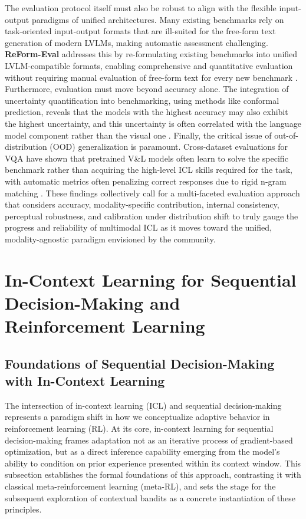 \documentclass[11pt]{article}
\begin{document}
The evaluation protocol itself must also be robust to align with the flexible input-output paradigms of unified architectures. Many existing benchmarks rely on task-oriented input-output formats that are ill-suited for the free-form text generation of modern LVLMs, making automatic assessment challenging. \textbf{ReForm-Eval} addresses this by re-formulating existing benchmarks into unified LVLM-compatible formats, enabling comprehensive and quantitative evaluation without requiring manual evaluation of free-form text for every new benchmark \cite{ref304}. Furthermore, evaluation must move beyond accuracy alone. The integration of uncertainty quantification into benchmarking, using methods like conformal prediction, reveals that the models with the highest accuracy may also exhibit the highest uncertainty, and this uncertainty is often correlated with the language model component rather than the visual one \cite{ref305}. Finally, the critical issue of out-of-distribution (OOD) generalization is paramount. Cross-dataset evaluations for VQA have shown that pretrained V\&L models often learn to solve the specific benchmark rather than acquiring the high-level ICL skills required for the task, with automatic metrics often penalizing correct responses due to rigid n-gram matching \cite{ref306}. These findings collectively call for a multi-faceted evaluation approach that considers accuracy, modality-specific contribution, internal consistency, perceptual robustness, and calibration under distribution shift to truly gauge the progress and reliability of multimodal ICL as it moves toward the unified, modality-agnostic paradigm envisioned by the community.

\section{In-Context Learning for Sequential Decision-Making and Reinforcement Learning}

\subsection{Foundations of Sequential Decision-Making with In-Context Learning}

The intersection of in-context learning (ICL) and sequential decision-making represents a paradigm shift in how we conceptualize adaptive behavior in reinforcement learning (RL). At its core, in-context learning for sequential decision-making frames adaptation not as an iterative process of gradient-based optimization, but as a direct inference capability emerging from the model's ability to condition on prior experience presented within its context window. This subsection establishes the formal foundations of this approach, contrasting it with classical meta-reinforcement learning (meta-RL), and sets the stage for the subsequent exploration of contextual bandits as a concrete instantiation of these principles.
\end{document}
